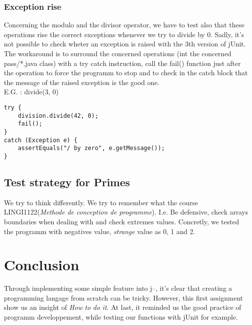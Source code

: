\documentclass[10pt,a4paper]{article}
\begin{document}
\subsubsection{Exception rise}
	Concerning the modulo and the divisor operator, we have to test also that these operations rise the correct exceptions whenever we try to divide by 0. Sadly, it's not possible to check wheter an exception is raised with the 3th version of jUnit. The workaround is to surround the concerned operations (int the concerned pass/*.java class) with a try catch instruction, call the fail() function just after the operation to force the programm to stop and to check  in the catch block that the message of the raised exception is the good one.\\ 
	E.G. : divide(3, 0)
\begin{lstlisting}
try {
	division.divide(42, 0);
	fail();
}
catch (Exception e) {
	assertEquals("/ by zero", e.getMessage());
}
\end{lstlisting}

\subsection{Test strategy for Primes}
We try to think differently. We try to remember what the course LINGI1122(\textit{Methode de conception de programme}). I.e. Be defensive, check arrays boundaries when dealing with and check extremes values. Concretly, we tested the programm with negatives value, \textit{strange} value as 0, 1 and 2. 
\section{Conclusion}

Through implementing some simple feature into j--, it's clear that creating a programming langage from scratch can be tricky. However, this first assignment show us an insight of \textit{How to do it}. At last, it reminded us the good practice of programm developpement, while testing our functions with jUnit for example.
\end{document}
